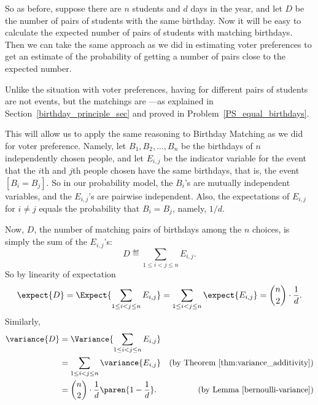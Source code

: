 So as before, suppose there are $n$ students and $d$ days in the year, and
let $D$ be the number of pairs of students with the same birthday.  Now it
will be easy to calculate the expected number of pairs of students with
matching birthdays.  Then we can take the same approach as we did in
estimating voter preferences to get an estimate of the probability of
getting a number of pairs close to the expected number.

Unlike the situation with voter preferences, having  for different pairs of students are not  events, but the matchings are \emph{} ---as explained in
Section~\ref{birthday_principle_sec} and proved in
Problem~\ref{PS_equal_birthdays}.
%
\iffalse For example, knowing that Alice and Bob have matching
birthdays, and also that Ted and Alice have matching birthdays
obviously implies that Bob and Ted have matching birthdays.  On the
other hand, knowing that Alice and Bob have matching birthdays tells
us nothing about whether Alice and Carol have matching birthdays,
namely, these two events really are independent.  So even though the
events that various pairs of students have matching birthdays are not
mutually independent, indeed not even three-way independent, they are
\index{pairwise independent} \emph{pairwise} independent.  \fi
This will allow us to apply the same reasoning to Birthday Matching
as we did for voter preference.  Namely, let $B_1,B_2,\dots,B_n$ be
the birthdays of $n$ independently chosen people, and let $E_{i,j}$ be
the indicator variable for the event that the $i$th and $j$th people
chosen have the same birthdays, that is, the event $[B_i = B_j]$.  So
in our probability model, the $B_i$'s are mutually independent variables,
and the $E_{i,j}$'s are pairwise independent.  Also, the expectations of
$E_{i,j}$ for $i \neq j$ equals the probability that $B_i = B_j$,
namely, $1/d$.

Now, $D$, the number of matching pairs of birthdays among the $n$
choices, is simply the sum of the $E_{i,j}$'s:
\begin{equation}\label{Vn}
D \eqdef \sum_{1\le i < j \le n} E_{i,j}.
\end{equation}
So by linearity of expectation
\[
\expect{D} = \Expect{\sum_{1\le i < j \le n} E_{i,j}} = 
               \sum_{1\le i < j \le n} \expect{E_{i,j}} =
               \binom{n}{2}\cdot \frac{1}{d}.
\]
Similarly,
\begin{align*}
\variance{D}
   & = \Variance{\sum_{1\le i < j \le n} E_{i,j}}\\
   & = \sum_{1\le i < j \le n} \variance{E_{i,j}}
           & \text{(by Theorem~\ref{thm:variance_additivity})}\\
   & = \binom{n}{2} \cdot \frac{1}{d}\paren{1-\frac{1}{d}}.
           & \text{(by Lemma~\ref{bernoulli-variance})}
\end{align*} 

